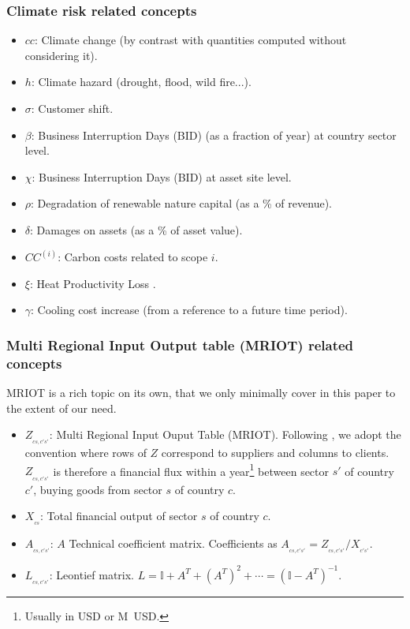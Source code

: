 \subsubsection{Climate risk related concepts}

\begin{itemize}
\item[•] $cc$: Climate change (by contrast with quantities computed without considering it).
\item[•] $h$: Climate hazard (drought, flood, wild fire...).
\item[•] $\sigma$: Customer shift.
\item[•] $\beta$:  Business Interruption Days (BID) (as a fraction of year) at country sector level.
\item[•] $\chi$:  Business Interruption Days (BID) at asset site level.
\item[•] $\rho$: Degradation of renewable nature capital (as a \% of revenue).
\item[•] $\delta$: Damages on assets (as a \% of asset value).
\item[•] $CC^{(i)}$: Carbon costs related to scope $i$.
\item[•] $\xi$: Heat Productivity Loss \cite{HI1}\cite{HI2}\cite{HPL1}\cite{HPL2}\cite{HPL3}.
\item[•] $\gamma$: Cooling cost increase \cite{CDD} (from a reference to a future time period).
\end{itemize}

\subsubsection{Multi Regional Input Output table (MRIOT) related concepts}

MRIOT is a rich topic on its own, that we only minimally cover in this paper to the extent of our need.

\begin{itemize}
\item[•] $Z_{_{cs,c's'}}$: Multi Regional Input Ouput Table (MRIOT). Following \cite{MillerMRIOT}, we adopt the convention where rows of $Z$ correspond to suppliers and columns to clients. $Z_{_{cs,c's'}}$ is therefore a financial flux within a year\footnote{Usually in USD or M~USD.} between sector $s'$ of country $c'$, buying goods from  sector $s$ of country $c$.
\item[•] $X_{_{cs}}$: Total financial output of sector $s$ of country $c$. 
\item[•] $A_{_{cs,c's'}}$:  $A$ Technical coefficient matrix. Coefficients as $A_{_{cs,c's'}}=Z_{_{cs,c's'}}/X_{_{c's'}}$.

\item[•] $L_{_{cs,c's'}}$:  Leontief matrix. $L=\mathbb{I}+ A^T+\left(A^T\right)^2+\cdots= \left(\mathbb{I}-A^T\right)^{-1}$.
\end{itemize}

